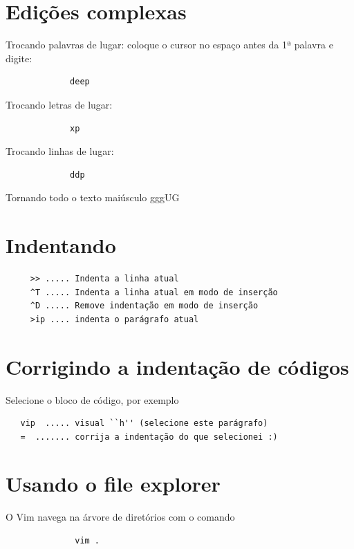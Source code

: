 \documentclass[10pt,a4paper,openany]{book}
\begin{document}
\section{Edições complexas }
\label{Edições complexas }

Trocando palavras de lugar: coloque o cursor no espaço antes da 1ª palavra e digite:

\begin{verbatim}
			 deep
\end{verbatim}

Trocando letras de lugar:

\begin{verbatim}
			 xp
\end{verbatim}

Trocando linhas de lugar:

\begin{verbatim}
			 ddp
\end{verbatim}

Tornando todo o texto maiúsculo
 gggUG

\section{Indentando }

\begin{verbatim}
	 >> ..... Indenta a linha atual
	 ^T ..... Indenta a linha atual em modo de inserção
	 ^D ..... Remove indentação em modo de inserção
	 >ip .... indenta o parágrafo atual
\end{verbatim}

\section{Corrigindo a indentação de códigos}
\label{Corrigindo a indentação de códigos}
Selecione o bloco de código, por exemplo

\begin{verbatim}
   vip  ..... visual ``h'' (selecione este parágrafo)
   =  ....... corrija a indentação do que selecionei :)
\end{verbatim}

\section{Usando o file explorer}
\label{Usando o file explorer}
O Vim navega na árvore de diretórios com o comando

\begin{verbatim}
			  vim .
\end{verbatim}
\end{document}
